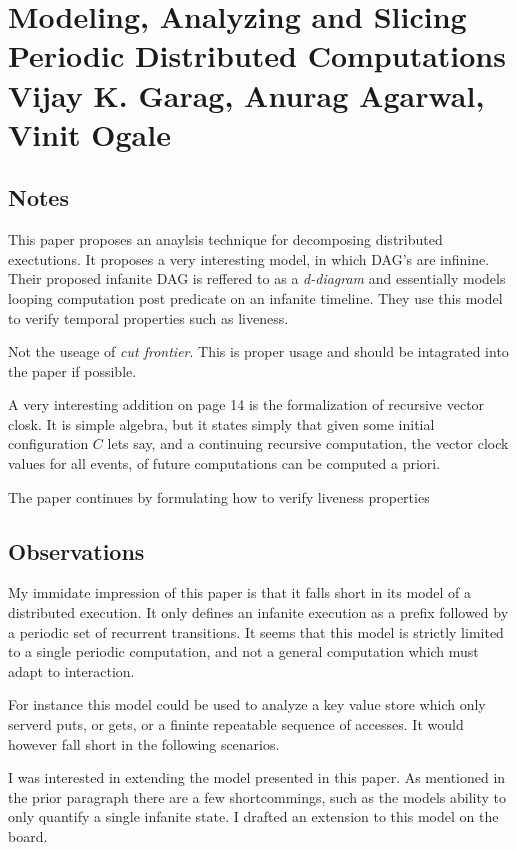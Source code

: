 \section{Modeling, Analyzing and Slicing Periodic Distributed Computations \\ 
\small{Vijay K. Garag, Anurag Agarwal, Vinit Ogale}}

\subsection{Notes}

This paper proposes an anaylsis technique for decomposing distributed
exectutions. It proposes a very interesting model, in which DAG's are infinine.
Their proposed infanite DAG is reffered to as a \textit{d-diagram} and
essentially models looping computation post predicate on an infanite timeline.
They use this model to verify temporal properties such as liveness.

Not the useage of \textit{cut frontier}. This is proper usage and should be
intagrated into the \dinv paper if possible.

A very interesting addition on page 14 is the formalization of recursive vector
closk. It is simple algebra, but it states simply that given some initial
configuration $C$ lets say, and a continuing recursive computation, the vector
clock values for all events, of future computations can be computed a priori.

The paper continues by formulating how to verify liveness properties 

\subsection{Observations}

My immidate impression of this paper is that it falls short in its model of a
distributed execution. It only defines an infanite execution as a prefix
followed by a periodic set of recurrent transitions. It seems that this model
is strictly limited to a single periodic computation, and not a general
computation which must adapt to interaction.

For instance this model could be used to analyze a key value store which only
serverd puts, or gets, or a fininte repeatable sequence of accesses. It would
however fall short in the following scenarios.

I was interested in extending the model presented in this paper. As mentioned
in the prior paragraph there are a few shortcommings, such as the models
ability to only quantify a single infanite state. I drafted an extension to
this model on the board. 

